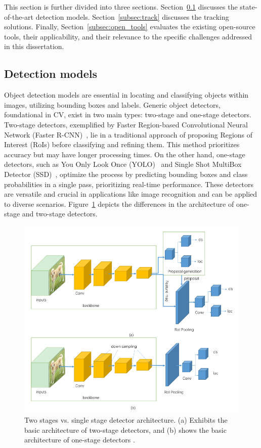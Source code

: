 This section is further divided into three sections.
Section~\ref{subsec:detect} discusses the state-of-the-art detection models.
Section~\ref{subsec:track} discusses the tracking solutions.
Finally, Section~\ref{subsec:open_tools} evaluates the existing open-source tools, their applicability, and their relevance to the specific challenges addressed in this dissertation.

\subsection{Detection models}\label{subsec:detect}

Object detection models are essential in locating and classifying objects within images, utilizing bounding boxes and labels.
Generic object detectors, foundational in CV, exist in two main types: two-stage and one-stage detectors.
Two-stage detectors, exemplified by Faster Region-based Convolutional Neural Network (Faster R-CNN)~\cite{FasterRCNN}, lie in a traditional approach of proposing Regions of Interest (RoIs) before classifying and refining them.
This method prioritizes accuracy but may have longer processing times.
On the other hand, one-stage detectors, such as You Only Look Once (YOLO)~\cite{YOLO} and Single Shot MultiBox Detector (SSD)~\cite{SSD}, optimize the process by predicting bounding boxes and class probabilities in a single pass, prioritizing real-time performance.
These detectors are versatile and crucial in applications like image recognition and can be applied to diverse scenarios.
Figure~\ref{fig:1vs2} depicts the differences in the architecture of one-stage and two-stage detectors.

\begin{figure}[H]
    \centering
    \includegraphics[width=0.6\linewidth]{figures/single vs two}
    \caption[Two stages vs. single stage detector architecture]{Two stages vs. single stage detector architecture. (a) Exhibits the basic architecture of two-stage detectors, and (b) shows the basic architecture of one-stage detectors \cite{1vs2}.}
    \label{fig:1vs2}
\end{figure}

